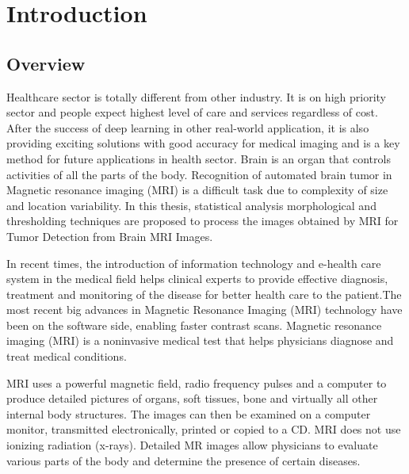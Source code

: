 
\chapter{Introduction} %

\label{Chapter1} %


\section{Overview}
Healthcare sector is totally different from other industry. It is on high priority sector and people expect highest level of care and services regardless of cost. After the success of deep learning in other real-world application, it is also providing exciting solutions with good accuracy for medical imaging and is a key method for future applications in health sector. Brain is an organ that controls activities of all the parts of the body. Recognition of automated brain tumor in
Magnetic resonance imaging (MRI) is a difficult task due to complexity of size and location variability. In this thesis, statistical analysis morphological and thresholding techniques are proposed to process the images obtained by MRI for Tumor Detection from Brain MRI Images. 

In recent times, the introduction of information technology and e-health care system in the medical field helps clinical experts to provide effective diagnosis, treatment and monitoring of the disease for better health care to the patient.The most recent big advances in Magnetic Resonance Imaging (MRI) technology have been on the software side, enabling faster contrast scans. Magnetic resonance imaging (MRI) is a noninvasive medical test that helps physicians diagnose and treat medical conditions.

MRI uses a powerful magnetic field, radio frequency pulses and a computer to produce detailed pictures of organs, soft tissues, bone and virtually all other internal body structures. The images can then be examined on a computer monitor, transmitted electronically, printed or copied to a CD. MRI does not use ionizing radiation (x-rays). Detailed MR images allow physicians to evaluate various parts of the body and determine the presence of certain diseases.

